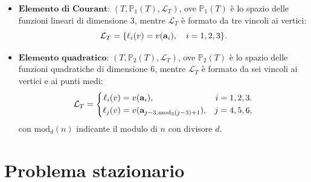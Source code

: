 \documentclass[11pt]{beamer}
\begin{document}
\begin{frame}
\begin{itemize}
                    \item $\textbf{Elemento di Courant}$: $(T,\mathbb P_1(T),\mathcal L_T)$, ove $\mathbb P_1(T)$ è lo spazio delle funzioni lineari di dimensione $3$, mentre $\mathcal L_T$ è formato da tre vincoli ai vertici:\vspace{-2.5pt}
                    \begin{equation*}
                        \setlength{\abovedisplayskip}{5pt plus 4pt minus 2pt}  %
                        \setlength{\belowdisplayskip}{5pt plus 2pt minus 2pt}  %
                        \mathcal L_T=\{\ell_i(v)=v(\mathbf a_i),\quad i=1,2,3\}.
                    \end{equation*}
                    \item $\textbf{Elemento quadratico}$: $(T,\mathbb P_2(T),\mathcal L_T)$, ove $\mathbb{P}_2(T)$ è lo spazio delle funzioni quadratiche di dimensione $6$, mentre $\mathcal L_T$ è formato da sei vincoli ai vertici e ai punti medi:
                    \begin{equation*}
                        \setlength{\abovedisplayskip}{5pt plus 2pt minus 2pt}  %
                        \setlength{\belowdisplayskip}{5pt plus 2pt minus 2pt}  %
                        \mathcal L_T=
                        \left\{
                        \begin{aligned}
                            \ell_i(v)&=v(\mathbf a_i),&i=1,2,3.\\
                            \ell_j(v)&=v(\mathbf a_{j-3,\text{mod}_3(j-3)+1}), &j=4,5,6,
                        \end{aligned}
                        \right.
                    \end{equation*}
                    con $\text{mod}_d(n)$ indicante il modulo di $n$ con divisore $d$.
                \end{itemize}
            
            \end{frame}
            
        \section{Problema stazionario}
        
\end{document}
